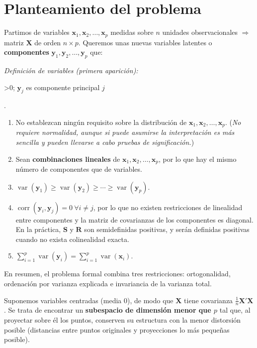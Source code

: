 \documentclass[12pt, a4paper]{article}
\theoremstyle{plain}
\theoremstyle{definition}
\theoremstyle{remark}
\newcommand{\mat}[1]{\mathbf{#1}}
\newcounter{varsprimcount}
\newenvironment{variablesprimera}{%
  \par\smallskip
  \noindent\textit{Definición de variables (primera aparición): }
  \setcounter{varsprimcount}{0}%
}{%
  .\par\smallskip
}
\newcommand{\varitem}[2]{%
  \ifnum\value{varsprimcount}>0\relax; \fi
  $#1$ es #2%
  \stepcounter{varsprimcount}%
}
\begin{document}
\section{Planteamiento del problema}

Partimos de variables $\mathbf{x}_1,\mathbf{x}_2,\dots,\mathbf{x}_p$ medidas
sobre $n$ unidades observacionales $\Rightarrow$ matriz $\mathbf{X}$ de orden
$n\times p$. Queremos unas nuevas variables latentes o \textbf{componentes}
$\mathbf{y}_1,\mathbf{y}_2,\dots,\mathbf{y}_p$ que:
\begin{variablesprimera}
  \varitem{\mathbf{y}_j}{componente principal $j$}
\end{variablesprimera}

\begin{enumerate}[label=\alph*)]
  \item No establezcan ningún requisito sobre la distribución de
        $\mathbf{x}_1,\mathbf{x}_2,\dots,\mathbf{x}_p$. (\emph{No requiere
        normalidad, aunque si puede asumirse la interpretación es más sencilla
        y pueden llevarse a cabo pruebas de significación.})
  \item Sean \textbf{combinaciones lineales} de
        $\mathbf{x}_1,\mathbf{x}_2,\dots,\mathbf{x}_p$, por lo que hay el
        mismo número de componentes que de variables.
  \item $\operatorname{var}(\mathbf{y}_1)\ge
        \operatorname{var}(\mathbf{y}_2)\ge\cdots\ge\operatorname{var}(\mathbf{y}_p)$.
  \item $\operatorname{corr}(\mathbf{y}_i,\mathbf{y}_j)=0\ \forall i\neq j$,
        por lo que no existen restricciones de linealidad entre componentes y
        la matriz de covarianzas de los componentes es diagonal. En la práctica,
        $\mat{S}$ y $\mat{R}$ son semidefinidas positivas, y serán definidas
        positivas cuando no exista colinealidad exacta.
  \item $\displaystyle\sum_{i=1}^p\operatorname{var}(\mathbf{y}_i)=
        \sum_{i=1}^p\operatorname{var}(\mathbf{x}_i)$.
\end{enumerate}

En resumen, el problema formal combina tres restricciones: ortogonalidad,
ordenación por varianza explicada e invariancia de la varianza total.

Suponemos variables centradas (media 0), de modo que
$\mathbf{X}$ tiene covarianza $\frac{1}{n}\mathbf{X}'\mathbf{X}$.
Se trata de encontrar un \textbf{subespacio de dimensión menor que $p$} tal
que, al proyectar sobre él los puntos, conserven su estructura con la menor
distorsión posible (distancias entre puntos originales y proyecciones lo más
pequeñas posible).
\end{document}
